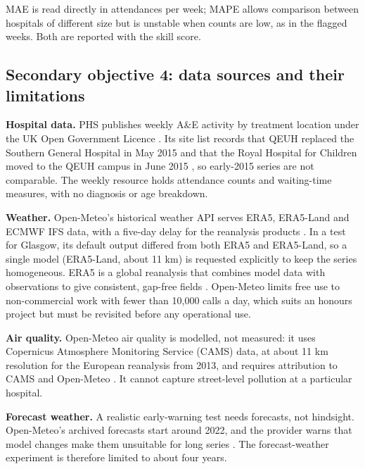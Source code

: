 \documentclass[12pt]{article}
\begin{document}
MAE is read directly in attendances per week; MAPE allows comparison between hospitals of different size but is unstable when counts are low, as in the flagged weeks. Both are reported with the skill score.

\subsection{Secondary objective 4: data sources and their limitations}
\textbf{Hospital data.} PHS publishes weekly A\&E activity by treatment location under the UK Open Government Licence \parencite{phs_weekly_ae}. Its site list records that QEUH replaced the Southern General Hospital in May 2015 and that the Royal Hospital for Children moved to the QEUH campus in June 2015 \parencite{phs_ae_sites}, so early-2015 series are not comparable. The weekly resource holds attendance counts and waiting-time measures, with no diagnosis or age breakdown.

\textbf{Weather.} Open-Meteo's historical weather API serves ERA5, ERA5-Land and ECMWF IFS data, with a five-day delay for the reanalysis products \parencite{openmeteo_hist,zippenfenig2024}. In a test for Glasgow, its default output differed from both ERA5 and ERA5-Land, so a single model (ERA5-Land, about 11 km) is requested explicitly to keep the series homogeneous. ERA5 is a global reanalysis that combines model data with observations to give consistent, gap-free fields \parencite{hersbach2020}. Open-Meteo limits free use to non-commercial work with fewer than 10,000 calls a day, which suits an honours project but must be revisited before any operational use.

\textbf{Air quality.} Open-Meteo air quality is modelled, not measured: it uses Copernicus Atmosphere Monitoring Service (CAMS) data, at about 11 km resolution for the European reanalysis from 2013, and requires attribution to CAMS and Open-Meteo \parencite{openmeteo_aq}. It cannot capture street-level pollution at a particular hospital.

\textbf{Forecast weather.} A realistic early-warning test needs forecasts, not hindsight. Open-Meteo's archived forecasts start around 2022, and the provider warns that model changes make them unsuitable for long series \parencite{openmeteo_hf}. The forecast-weather experiment is therefore limited to about four years.
\end{document}
